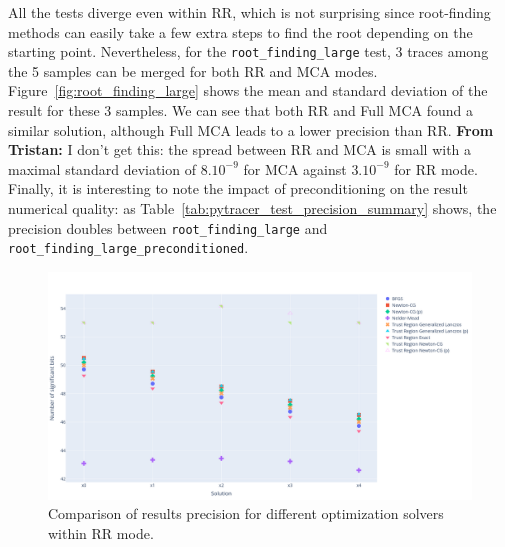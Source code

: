 \documentclass[11pt]{article}
\newcommand{\tristan}[1]{\color{orange}\textbf{From Tristan:} #1\color{black}\xspace}
\begin{document}
All the tests diverge even within RR, which is not surprising since root-finding methods can easily take a few extra steps to find the root depending on the starting point. Nevertheless, for the \texttt{root\_finding\_large} test, 3 traces among the 5 samples can be merged for both RR and MCA modes.
Figure~\ref{fig:root_finding_large} shows the mean and standard deviation of the result for these 3 samples. We can see that both RR and Full MCA found a similar solution, although Full MCA leads to a lower precision than RR. \tristan{I don't get this: the spread between RR and MCA is small with a maximal standard deviation of $8.10^{-9}$ for MCA against $3.10^{-9}$ for RR mode.} Finally, it is interesting to note the impact of preconditioning on the result numerical quality: as Table~\ref{tab:pytracer_test_precision_summary} shows, the precision doubles between \texttt{root\_finding\_large} and \texttt{root\_finding\_large\_preconditioned}.

\begin{figure}
    \centering
    \includegraphics[width=\linewidth]{figure/unconstrained_optimization_comparison.png}
    \caption{Comparison of results precision for different optimization solvers within RR mode.}
    \label{fig:unconstrained_optimization}
\end{figure}
\end{document}

